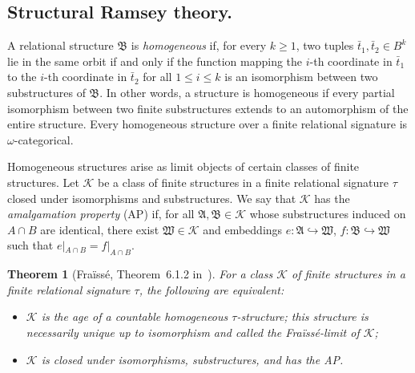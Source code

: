 \documentclass[oneside,reqno,12pt]{amsart}
\theoremstyle{plain}
\newtheorem{theorem}[thm]{Theorem}
\theoremstyle{remark}
\newcommand{\struct}[1]{\mathfrak{#1}}
\begin{document}
{  
 
 


 \subsection{Structural Ramsey theory.} 
A relational structure $\struct{B}$ is \emph{homogeneous} if, for every $k\geq 1$, two tuples $\bar{t}_1,\bar{t}_2\in B^k$ lie in the same orbit if and only if the function mapping the $i$-th coordinate in $\bar{t}_1$ to the $i$-th coordinate in $\bar{t}_2$ for all $1\leq i\leq k$ is an isomorphism between two substructures of $\struct{B}$. 
In other words, a structure is homogeneous if every partial isomorphism between two finite substructures extends to an automorphism of the entire structure.
Every homogeneous structure over a finite relational signature is $\omega$-categorical.

Homogeneous structures arise as limit objects of certain classes of finite structures.
Let $\mathcal{K}$ be a class of finite structures in a finite relational signature $\tau$ closed under isomorphisms and substructures.  
We say that $\mathcal{K}$ has the \emph{amalgamation property} (AP) if, for all $\struct{A},\struct{B} \in \mathcal{K}$ whose substructures induced on $A\cap B$ are identical, there exist  $\struct{W}\in \mathcal{K}$ and embeddings $e\colon \struct{A}\hookrightarrow \struct{W}$, $f\colon \struct{B} \hookrightarrow \struct{W}$
such that $e|_{A\cap B} = f|_{A\cap B}.$
\begin{theorem}[Fra\"{i}ss\'{e}, Theorem~6.1.2 in~\cite{hodges_book}] \label{theorem:fraisse_2} For a class $\mathcal{K}$ of finite structures in a finite relational signature $\tau$, the following are equivalent:
\begin{itemize}
    \item $\mathcal{K}$  is the age of a  countable homogeneous $\tau$-structure; this structure is necessarily unique up to isomorphism and called the \emph{Fra\"{i}ss\'{e}-limit} of $\mathcal{K}$;

\item $\mathcal{K}$ is closed under isomorphisms, substructures, and has the AP.
\end{itemize}
\end{theorem} 
  
}
\end{document}
